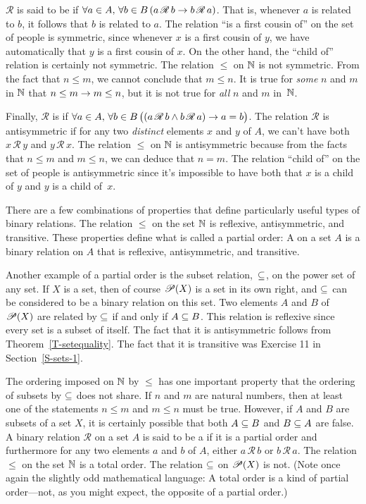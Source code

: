 ${\mathscr R}$ is said to be  if 
$\forall a\in A,\,\forall b\in B\, (a\,{\mathscr R}\,b\rightarrow b\,{\mathscr R}\,a)$.
That is, whenever $a$ is related to $b$, it follows that $b$ is related to $a$.
The relation ``is a first cousin of'' on the set of people is
symmetric, since whenever $x$ is a first cousin of $y$, we have
automatically that $y$ is a first cousin of $x$.  On the other hand,
the ``child of'' relation is certainly not symmetric.  The relation
$\le$ on ${\mathbb N}$ is not symmetric.  From the fact that $n\le m$,
we cannot conclude that $m\le n$.  It is true for \emph{some}
$n$ and $m$ in ${\mathbb N}$ that $n\le m\rightarrow m\le n$, but it is not true
for \emph{all} $n$ and $m$ in~${\mathbb N}$.

Finally, $\mathscr R$ is 
if $\forall a\in A,\,\forall b\in B\, \big((a\,{\mathscr R}\,b\wedge b\,{\mathscr R}\,a)\rightarrow a=b\big)$.
The relation $\mathscr R$ is antisymmetric if for any two
\emph{distinct} elements $x$ and $y$ of $A$, we can't have both
$x\,{\mathscr R}\,y$ and $y\,{\mathscr R}\,x$.  The relation
$\le$ on ${\mathbb N}$ is antisymmetric because from the facts that
$n\le m$ and $m\le n$, we can deduce that $n=m$.  The relation
``child of'' on the set of people is antisymmetric since 
it's impossible to have both that $x$ is a child of $y$ and
$y$ is a child of~$x$.

\medbreak

There are a few combinations of properties that define particularly
useful types of binary relations.
The relation $\le$ on the set ${\mathbb N}$ is reflexive, antisymmetric, and
transitive.  These properties define what is called a partial order:
A  on a set $A$ is a binary relation on $A$ that
is reflexive, antisymmetric, and transitive.  

Another example of a partial order is the subset relation,~$\subseteq$,
on the power set of any set.  If $X$ is a set, then of course
${\mathscr P}(X)$ is a set in its own right, and $\subseteq$ can be considered to
be a binary relation on this set.  Two elements $A$ and $B$ of
${\mathscr P}(X)$ are related by $\subseteq$ if and only if $A\subseteq B$.  This
relation is reflexive since every set is a subset of itself.
The fact that it is antisymmetric follows from Theorem~\ref{T-setequality}.
The fact that it is transitive was Exercise 11 in Section~\ref{S-sets-1}.

The ordering imposed on ${\mathbb N}$ by $\le$ has one important property
that the ordering of subsets by $\subseteq$ does not share.  If $n$ and
$m$ are natural numbers, then at least one of the statements
$n\le m$ and $m\le n$ must be true.  However, if $A$ and $B$ are
subsets of a set $X$, it is certainly possible that both
$A\subseteq B$ and $B\subseteq A$ are false.  A binary relation $\mathscr R$ on a set $A$ is said to
be a  if it is a partial order and furthermore
for any two elements $a$ and $b$ of $A$, either $a\,{\mathscr R}\,b$
or $b\,{\mathscr R}\,a$.  The relation $\le$ on the set ${\mathbb N}$ is
a total order.  The relation $\subseteq$ on ${\mathscr P}(X)$ is not.
(Note once again the slightly odd mathematical language:
A total order is a kind of partial order---not, as you might
expect, the opposite of a partial order.)

